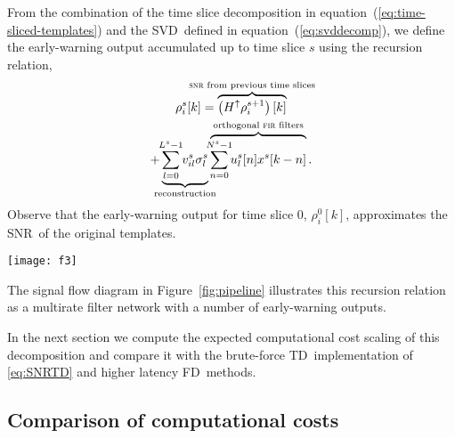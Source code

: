 \documentclass[preprint2]{aastex}
\newcommand{\SNR}{SNR}%
\newcommand{\SVD}{SVD}%
\newcommand{\fir}{FIR}%
\newcommand{\lloid}{LLOID}%
\newcommand{\TD}{TD}%
\newcommand{\FD}{FD}%
\def\clap#1{\hbox to 0pt{\hss#1\hss}}
\def\mathclap{\mathpalette\mathclapinternal}
\def\mathclapinternal#1#2{\clap{$\mathsurround=0pt#1{#2}$}}
\begin{document}
From the combination of the time slice decomposition in
equation~(\ref{eq:time-sliced-templates}) and the \SVD\ defined in
equation~(\ref{eq:svddecomp}), we define the early-warning output accumulated
up to time slice $s$ using the recursion relation,
%
%
\begin{multline}
	\rho_i^s [k] =%
		\overbrace{
			\left(H^\uparrow \rho_i^{s+1}\right)[k]
		}^\textrm{\clap{{\sc snr} from previous time slices}} \\
		+
		\underbrace{
			\sum_{\mathclap{l=0}}^{\mathclap{L^s-1}} v_{il}^s \sigma_l^s
		}_\textrm{\clap{reconstruction}}
		\overbrace{
			\sum_{\mathclap{n=0}}^{\mathclap{N^s-1}} u_l^s[n] x^s[k-n]
		}^\textrm{\clap{orthogonal {\sc fir} filters}} .
\end{multline}
%
%
Observe that the early-warning output for time slice 0, $\rho_i^0[k]$,
approximates the \SNR\ of the original templates.
%
%
\begin{figure*}[h!]
	\begin{center}
		\texttt{[image: f3]}
		\caption{\label{fig:pipeline} Schematic of \lloid\ pipeline illustrating
signal flow.  Circles with arrows represent interpolation
\protect\texttt{[image: f3a]} or decimation
\protect\texttt{[image: f3b]}.  Circles with plus
signs represent summing junctions
\protect\texttt{[image: f3c]}.  Squares
\protect\texttt{[image: f3d]} stand for \fir\ filters.  Sample
rate decreases from the top of the diagram to the bottom.  In this diagram each
time slice contains three \fir\ filters that are linearly combined to produce
four output channels.  In a typical pipeline the number of \fir\ filters is
much less than the number of output channels.}
	\end{center}
\end{figure*}
%
%
The signal flow diagram in Figure~\ref{fig:pipeline} illustrates this
recursion relation as a multirate filter network with a number of early-warning outputs.

In the next section we compute the expected computational cost scaling of this
decomposition and compare it with the brute-force \TD\ implementation of
\eqref{eq:SNRTD} and higher latency \FD\ methods.

\subsection{Comparison of computational costs}
\end{document}
